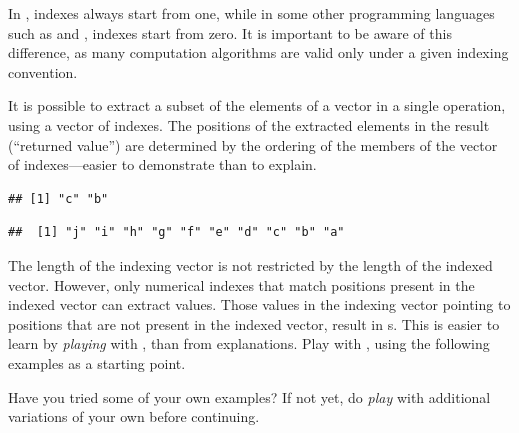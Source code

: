 \documentclass[krantz2]{krantz}\usepackage{knitr}
\begin{document}
\begin{warningbox}
In \Rlang, indexes always start from one, while in some other programming languages such as \Clang and \Cpplang, indexes start from zero. It is important to be aware of this difference, as many computation algorithms are valid only under a given indexing convention.
\end{warningbox}

It is possible to extract a subset of the elements of a vector in a single operation, using a vector of indexes. The positions of the extracted elements in the result (``returned value'') are determined by the ordering of the members of the vector of indexes---easier to demonstrate than to explain.

\begin{knitrout}\footnotesize
{}\color{fgcolor}\begin{kframe}
\begin{alltt}
\hlstd{a[}\hlstd{(}\hlstd{,}\hlstd{)]}
\end{alltt}
\begin{verbatim}
## [1] "c" "b"
\end{verbatim}
\begin{alltt}
\hlstd{a[}\hlopt{:}\hlstd{]}
\end{alltt}
\begin{verbatim}
##  [1] "j" "i" "h" "g" "f" "e" "d" "c" "b" "a"
\end{verbatim}
\end{kframe}
\end{knitrout}

\begin{playground}
The length of the indexing vector is not restricted by the length of the indexed vector. However, only numerical indexes that match positions present in the indexed vector can extract values. Those values in the indexing vector pointing to positions that are not present in the indexed vector, result in s. This is easier to learn by \emph{playing} with \Rlang, than from explanations. Play with \Rlang, using the following examples as a starting point.

\begin{knitrout}\footnotesize
{}\color{fgcolor}\begin{kframe}
\begin{alltt}
\hlstd{a[}\hlstd{(}\hlstd{,}\hlstd{,}\hlstd{,}\hlstd{)]}
\hlstd{a[}\hlstd{(}\hlopt{:}\hlstd{,} \hlopt{:}\hlstd{)]}
\hlstd{a[}\hlstd{(}\hlstd{,}\hlstd{)]}
\hlstd{a[}\hlstd{]}
\end{alltt}
\end{kframe}
\end{knitrout}

Have you tried some of your own examples? If not yet, do \emph{play} with additional variations of your own before continuing.

\end{playground}
\end{document}
